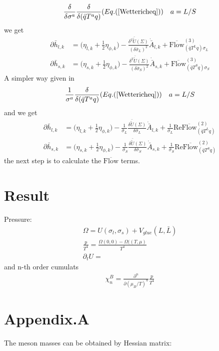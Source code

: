 \documentclass[12pt]{article}
\begin{document}
\begin{align}
\frac{{\delta}}{\delta \sigma^a}\frac{{\delta}}{\delta(\bar q T^a q)}(Eq. (\ref{Wettericheq})) \quad a=L/S
\end{align}
we get
\begin{align}
\partial \bar h_{l,k}&=\bigg( \eta_{l,k} +\frac{1}{2}\eta_{\phi,k}\bigg )-\frac{\delta^2 \bar {\tilde U}(\Sigma)}{(\delta \bar \sigma_L)^2}\dot{\bar A}_{l,k}+\overline{  \text{Flow} }_{(\bar q T^L q) \sigma_L}^{(3)}\\
\partial \bar h_{s,k}&=\bigg( \eta_{s,k} +\frac{1}{2}\eta_{\phi,k}\bigg )-\frac{\delta^2 \bar {\tilde U}(\Sigma)}{(\delta \bar \sigma_S)^2}\dot{\bar A}_{s,k}+\overline{  \text{Flow} }_{(\bar q T^S q) \sigma_S}^{(3)}
\end{align}
A simpler way given in \cite{}
\begin{align}
\frac{{1}}{\sigma^a}\frac{{\delta}}{\delta(\bar q T^a q)}(Eq. (\ref{Wettericheq})) \quad a=L/S
\end{align}
and we get
\begin{align}
\partial \bar h_{l,k}&=\bigg( \eta_{l,k} +\frac{1}{2}\eta_{\phi,k}\bigg )-\frac{1}{\bar \sigma_L} \frac{\delta \bar{\tilde U}(\Sigma)}{\delta \bar \sigma_L}\dot{\bar A}_{l,k}+\frac{1}{\bar \sigma_L} \text{Re} \overline{  \text{Flow} }_{(\bar q T^L q)}^{(2)}\\
\partial \bar h_{s,k}&=\bigg( \eta_{s,k} +\frac{1}{2}\eta_{\phi,k}\bigg )-\frac{1}{\bar \sigma_S} \frac{\delta \bar{\tilde U}(\Sigma)}{\delta \bar \sigma_S}\dot{\bar A}_{s,k}+\frac{1}{\bar \sigma_S} \text{Re} \overline{  \text{Flow} }_{(\bar q T^S q)}^{(2)} \label{Yukawa_eq}
\end{align}
the next step is to calculate the $\overline{\text{Flow}}$ terms.

\section{Result}
Pressure:
\begin{align}
\Omega=U (\sigma_l,\sigma_s)+V_{glue}(L,\bar L) \\
\frac{p}{T^4}=\frac{\Omega(0,0)-\Omega((T,\mu)}{T^4}\\
\partial_t U=
\end{align}
and  n-th order cumulats
\begin{align}
\chi^B_n=\frac{\partial^n}{\partial (\mu_B/T)^n}\frac{p}{T^4}
\end{align}

\section{Appendix.A}
The meson masses can be obtained by Hessian matrix:
\end{document}
